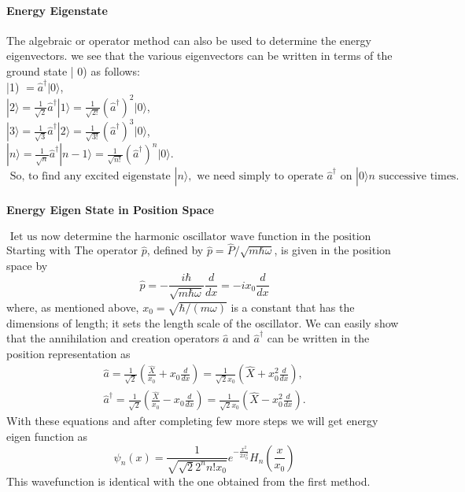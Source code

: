 \paragraph{Energy Eigenstate}
The algebraic or operator method can also be used to determine the energy eigenvectors.  we see that the various eigenvectors can be written in terms of the ground state | 0) as follows:\\
|1) $=\hat{a}^{\dagger}|0\rangle$,\\
$|2\rangle=\frac{1}{\sqrt{2}} \hat{a}^{\dagger}|1\rangle=\frac{1}{\sqrt{2 !}}\left(\hat{a}^{\dagger}\right)^{2}|0\rangle$,\\
$|3\rangle=\frac{1}{\sqrt{3}} \hat{a}^{\dagger}|2\rangle=\frac{1}{\sqrt{3 !}}\left(\hat{a}^{\dagger}\right)^{3}|0\rangle$,\\
$|n\rangle=\frac{1}{\sqrt{n}} \hat{a}^{\dagger}|n-1\rangle=\frac{1}{\sqrt{n !}}\left(\hat{a}^{\dagger}\right)^{n}|0\rangle .$\\
$\text { So, to find any excited eigenstate }|n\rangle, \text { we need simply to operate } \hat{a}^{\dagger} \text { on }|0\rangle n \text { successive times. }$
 \paragraph{Energy Eigen State in Position Space}
 $\text { Iet us now determine the harmonic oscillator wave function in the position representation. }$ \\
 Starting with The operator $\hat{p}$, defined by $\hat{p}=\hat{P} / \sqrt{m \hbar \omega}$, is given in the position space by
 $$
 \hat{p}=-\frac{i \hbar}{\sqrt{m \hbar \omega}} \frac{d}{d x}=-i x_{0} \frac{d}{d x}
 $$
 where, as mentioned above, $x_{0}=\sqrt{\hbar /(m \omega)}$ is a constant that has the dimensions of length; it sets the length scale of the oscillator. We can easily show that the annihilation and creation operators $\hat{a}$ and $\hat{a}^{\dagger}$ can be written in the position representation as
 $$\begin{gathered}
 \hat{a}=\frac{1}{\sqrt{2}}\left(\frac{\hat{X}}{x_{0}}+x_{0} \frac{d}{d x}\right)=\frac{1}{\sqrt{2} x_{0}}\left(\hat{X}+x_{0}^{2} \frac{d}{d x}\right), \\
 \hat{a}^{\dagger}=\frac{1}{\sqrt{2}}\left(\frac{\hat{X}}{x_{0}}-x_{0} \frac{d}{d x}\right)=\frac{1}{\sqrt{2} x_{0}}\left(\hat{X}-x_{0}^{2} \frac{d}{d x}\right) .
 \end{gathered}$$
 With these equations and after completing few more steps we will get energy eigen function as \\
 $$\psi_{n}(x)=\frac{1}{\sqrt{\sqrt{2}2^{n}n!x_{0}}}e^{-\frac{x^2}{2x_0^2}}H_n\left( \frac{x}{x_0}\right) $$
 This wavefunction is identical with the one obtained from the first method.\\

